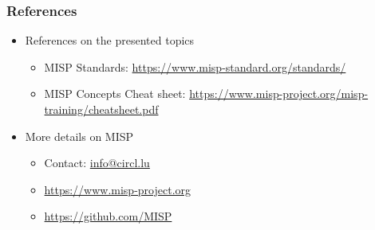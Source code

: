 \begin{frame}
    \frametitle{References}
    \begin{itemize}
        \item References on the presented topics
        \begin{itemize}
            \item MISP Standards: \url{https://www.misp-standard.org/standards/}
            \item MISP Concepts Cheat sheet: \url{https://www.misp-project.org/misp-training/cheatsheet.pdf}
        \end{itemize}
        \item More details on MISP
        \begin{itemize}
            \item Contact: \url{info@circl.lu}
            \item \url{https://www.misp-project.org}
            \item \url{https://github.com/MISP}
        \end{itemize}
    \end{itemize}
\end{frame}
